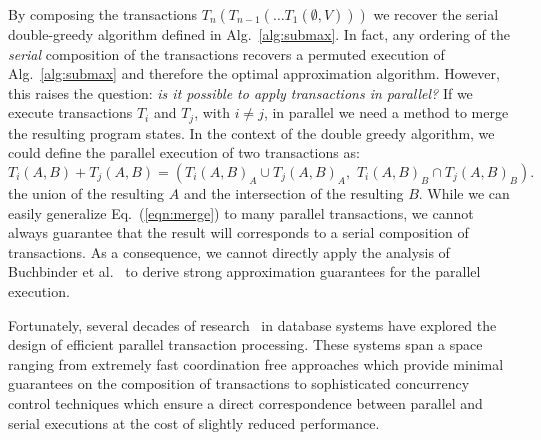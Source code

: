 \documentclass{article} %
\newcommand{\eg}{{\em e.g.,}~}
\newcommand{\eqnref}[1]{Eq.~(\ref{#1})}
\newcommand{\algref}[1]{Alg.~\ref{#1}}
\newcommand{\union}{\cup}
\newcommand{\inter}{\cap}
\begin{document}
By composing the transactions $T_n (T_{n-1}(\ldots T_1(\emptyset, V)))$ we recover the serial double-greedy algorithm defined in \algref{alg:submax}.
In fact, any ordering of the \emph{serial} composition of the transactions recovers a permuted execution of \algref{alg:submax} and therefore the optimal approximation algorithm.
However, this raises the question: \emph{is it possible to apply transactions in parallel?}
If we execute transactions $T_i$ and $T_j$, with $i \neq j$, in parallel we
need a method to merge the resulting program states.
In the context of the double greedy algorithm, we could define the parallel execution of two transactions as:
\begin{equation}
T_i(A,B) + T_j(A,B) = \left(T_i(A,B)_A \union T_j(A,B)_A,  \,\, T_i(A,B)_B  \inter T_j(A,B)_B \right).
\label{eqn:merge}
\end{equation}
the union of the resulting $A$ and the intersection of the resulting $B$.
While we can easily generalize \eqnref{eqn:merge} to many parallel transactions, we cannot always guarantee that the result will corresponds to a serial composition of transactions.
As a consequence, we cannot directly apply the analysis of Buchbinder et al.~\cite{buchbinder2012} to derive strong approximation guarantees for the parallel execution.

Fortunately, several decades of research~\citep{Ozsu07,kung1981:occ} in database systems have explored the design of efficient parallel transaction processing.
These systems span a space ranging from extremely fast coordination free approaches which provide minimal guarantees on the composition of transactions to sophisticated concurrency control techniques which ensure a direct correspondence between parallel and serial executions at the cost of slightly reduced performance.




\end{document}
